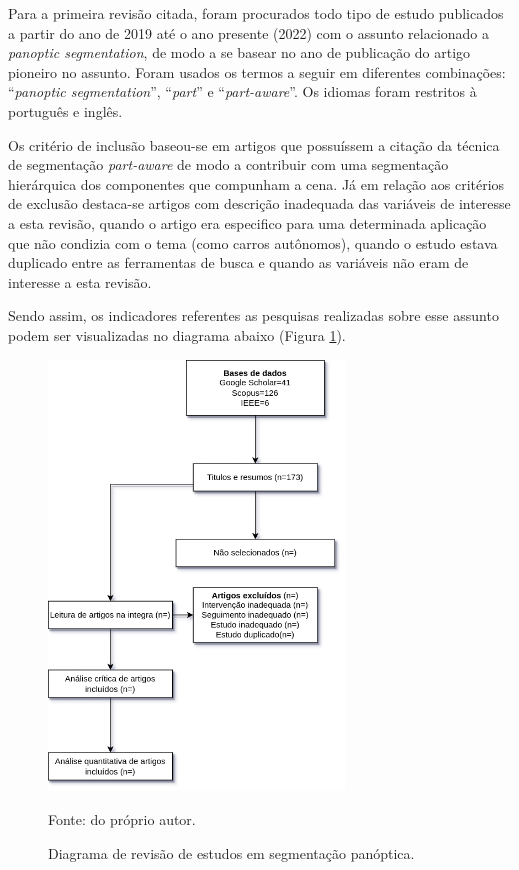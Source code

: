 Para a primeira revisão citada, foram procurados todo tipo de estudo publicados a partir do ano de 2019 até o ano presente (2022) com o assunto relacionado a \textit{panoptic segmentation}, de modo a se basear no ano de publicação do artigo pioneiro \cite{Kirillov2019a} no assunto. Foram usados os termos a seguir em diferentes combinações: ``\textit{panoptic segmentation}'', ``\textit{part}'' e ``\textit{part-aware}''. Os idiomas foram restritos à português e inglês.

Os critério de inclusão baseou-se em artigos que possuíssem a citação da técnica de segmentação \textit{part-aware} de modo a contribuir com uma segmentação hierárquica dos componentes que compunham a cena. Já em relação aos critérios de exclusão destaca-se artigos com descrição inadequada das variáveis de interesse a esta revisão, quando o artigo era especifico para uma determinada aplicação que não condizia com o tema (como carros autônomos), quando o estudo estava duplicado entre as ferramentas de busca e quando as variáveis não eram de interesse a esta revisão.

Sendo assim, os indicadores referentes as pesquisas realizadas sobre esse assunto podem ser visualizadas no diagrama abaixo (Figura \ref{proposal:revision:fig:1}).

\begin{figure}[H]
    \centering
    \caption{Diagrama de revisão de estudos em segmentação panóptica.}
    \includegraphics[height=4.5in]{recursos/imagens/proposal/revisao1.png}
    \label{proposal:revision:fig:1}

    \vspace*{1 cm}
    Fonte: do próprio autor.
\end{figure}

